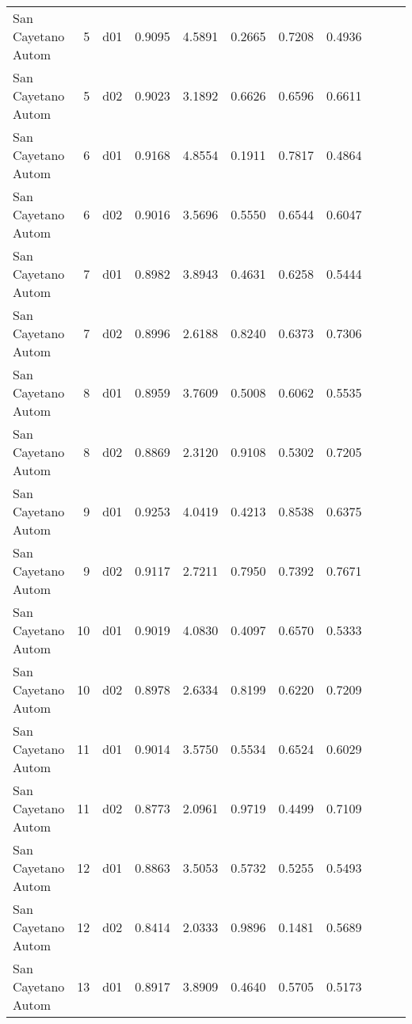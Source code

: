 \begin{landscape}
\begin{longtable}{p{2cm}rrrrrrrrrr}
     San Cayetano Autom   &          5 &     d01 &   0.9095 &  4.5891 &        0.2665 &           0.7208 &  0.4936 \\
     San Cayetano Autom   &          5 &     d02 &   0.9023 &  3.1892 &        0.6626 &           0.6596 &  0.6611 \\
     San Cayetano Autom   &          6 &     d01 &   0.9168 &  4.8554 &        0.1911 &           0.7817 &  0.4864 \\
     San Cayetano Autom   &          6 &     d02 &   0.9016 &  3.5696 &        0.5550 &           0.6544 &  0.6047 \\
     San Cayetano Autom   &          7 &     d01 &   0.8982 &  3.8943 &        0.4631 &           0.6258 &  0.5444 \\
     San Cayetano Autom   &          7 &     d02 &   0.8996 &  2.6188 &        0.8240 &           0.6373 &  0.7306 \\
     San Cayetano Autom   &          8 &     d01 &   0.8959 &  3.7609 &        0.5008 &           0.6062 &  0.5535 \\
     San Cayetano Autom   &          8 &     d02 &   0.8869 &  2.3120 &        0.9108 &           0.5302 &  0.7205 \\
     San Cayetano Autom   &          9 &     d01 &   0.9253 &  4.0419 &        0.4213 &           0.8538 &  0.6375 \\
     San Cayetano Autom   &          9 &     d02 &   0.9117 &  2.7211 &        0.7950 &           0.7392 &  0.7671 \\
     San Cayetano Autom   &         10 &     d01 &   0.9019 &  4.0830 &        0.4097 &           0.6570 &  0.5333 \\
     San Cayetano Autom   &         10 &     d02 &   0.8978 &  2.6334 &        0.8199 &           0.6220 &  0.7209 \\
     San Cayetano Autom   &         11 &     d01 &   0.9014 &  3.5750 &        0.5534 &           0.6524 &  0.6029 \\
     San Cayetano Autom   &         11 &     d02 &   0.8773 &  2.0961 &        0.9719 &           0.4499 &  0.7109 \\
     San Cayetano Autom   &         12 &     d01 &   0.8863 &  3.5053 &        0.5732 &           0.5255 &  0.5493 \\
     San Cayetano Autom   &         12 &     d02 &   0.8414 &  2.0333 &        0.9896 &           0.1481 &  0.5689 \\
     San Cayetano Autom   &         13 &     d01 &   0.8917 &  3.8909 &        0.4640 &           0.5705 &  0.5173 \\

\end{longtable}
\end{landscape}
